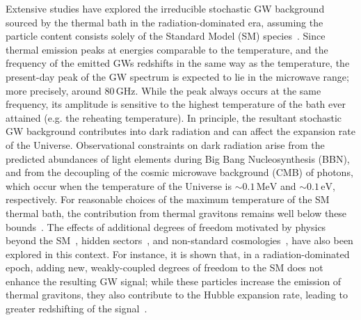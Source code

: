 Extensive studies have explored the irreducible stochastic GW background sourced by the thermal bath in the radiation-dominated era, assuming the particle content consists solely of the Standard Model (SM) species~\cite{Ghiglieri:2015nfa,Ghiglieri:2020mhm,Ringwald:2020ist}. Since thermal emission peaks at energies comparable to the temperature, and the frequency of the emitted GWs redshifts in the same way as the temperature, the present-day peak of the GW spectrum is expected to lie in the microwave range; more precisely, around 80\,GHz. While the peak always occurs at the same frequency, its amplitude is sensitive to the highest temperature of the bath ever attained (e.g. the reheating temperature). In principle, the resultant stochastic GW background contributes into dark radiation and can affect the expansion rate of the Universe. Observational constraints on dark radiation arise from the predicted abundances of light elements during Big Bang Nucleosynthesis (BBN), and from the decoupling of the cosmic microwave background (CMB) of photons, which occur when the temperature of the Universe is $\sim 0.1\,\text{MeV}$ and $\sim 0.1\,\text{eV}$, respectively. For reasonable choices of the maximum temperature of the SM thermal bath, the contribution from thermal gravitons remains well below these bounds~\cite{Ringwald:2020ist}.
The effects of additional degrees of freedom motivated by physics beyond the SM~\cite{Ringwald:2020ist}, hidden sectors~\cite{Drewes:2023oxg}, and non-standard cosmologies~\cite{Muia:2023wru,Bernal:2024jim,Ai:2025fqw}, have also been explored in this context. For instance,  it is shown that, in a radiation-dominated epoch, adding new, weakly-coupled degrees of freedom to the SM does not enhance the resulting GW signal; while these particles increase the emission of thermal gravitons, they also contribute to the Hubble expansion rate, leading to greater redshifting of the signal~\cite{Ringwald:2020ist,Muia:2023wru}.

\medskip

